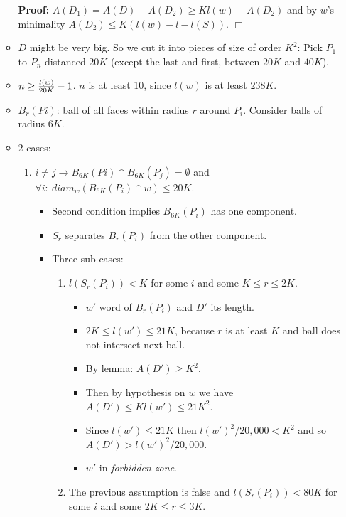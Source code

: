 \documentclass[11pt]{article} \usepackage{amssymb}
\newenvironment{proof}{\noindent \textbf{Proof:}}{$\Box$}
\begin{document}
\begin{enumerate}
\begin{itemize}
      \begin{proof}
        $A(D_1)=A(D)-A(D_2)\geq Kl(w)-A(D_2)$ and
        by $w$'s minimality $A(D_2)\leq K(l(w)-l-l(S))$.
      \end{proof}
    \item $D$ might be very big. So we cut it into pieces of size of order 
      $K^2$:
      Pick $P_1$ to $P_n$ distanced $20K$ 
      (except the last and first, between $20K$
      and $40K$).
    \item $n\geq {l(w)\over 20K}-1$. $n$ is at least 10, since $l(w)$ is at least $238K$.
    \item $B_r(Pi)$: ball of all faces within radius $r$ around $P_i$. Consider
      balls of radius $6K$.
    \item 2 cases:
      \begin{enumerate}
      \item $i\neq j\to B_{6K}(Pi)\cap B_{6K}(P_j)=\emptyset$ and 
        $\forall i:\:diam_w(B_{6K}(P_i)\cap w)\leq 20K$.
        \begin{itemize}
        \item Second condition implies $\overline{B_{6K}(P_i)}$ has one 
          component.
        \item $S_r$ separates $B_r(P_i)$ from the other component.
        \item Three sub-cases:
          \begin{enumerate}
          \item $l(S_r(P_i))<K$ for some $i$ and some $K \leq r \leq 2K$. 
            \begin{itemize}
            \item $w'$ word of $B_r(P_i)$ and $D'$ its length.
            \item $2K\leq l(w') \leq 21K$, because $r$ is at least $K$ and 
              ball does not
              intersect next ball. 
            \item By lemma: $A(D')\geq K^2$.
            \item Then by hypothesis on $w$ we have 
              $A(D')\leq Kl(w')\leq 21K^2$.
            \item Since $l(w')\leq 21K$ then $l(w')^2/20,000<K^2$ and so
              $A(D')>l(w')^2/20,000$.
            \item $w'$ in {\em forbidden zone}.
            \end{itemize}
          \item  The previous assumption is false and 
            $l(S_r(P_i))<80K$ for some $i$ and some $2K \leq r \leq 3K$. 

\end{enumerate}
\end{itemize}
\end{enumerate}
\end{itemize}
\end{enumerate}
\end{document}

